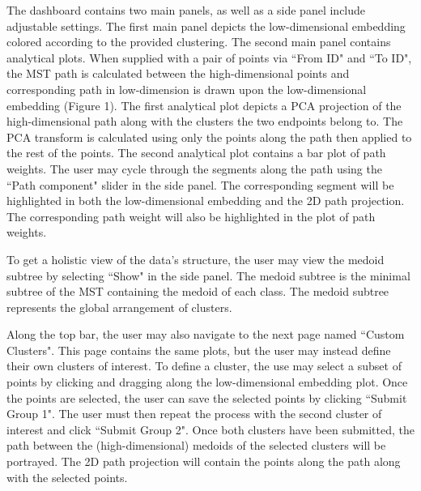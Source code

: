 \documentclass{article}
\begin{document}
The dashboard contains two main panels, as well as a side panel include adjustable settings. The first main panel depicts the low-dimensional embedding colored according to the provided clustering. The second main panel contains analytical plots. When supplied with a pair of points via ``From ID" and ``To ID", the MST path is calculated between the high-dimensional points and corresponding path in low-dimension is drawn upon the low-dimensional embedding (Figure 1). The first analytical plot depicts a PCA projection of the high-dimensional path along with the clusters the two endpoints belong to. The PCA transform is calculated using only the points along the path then applied to the rest of the points. The second analytical plot contains a bar plot of path weights. The user may cycle through the segments along the path using the ``Path component" slider in the side panel. The corresponding segment will be highlighted in both the low-dimensional embedding and the 2D path projection. The corresponding path weight will also be highlighted in the plot of path weights.

To get a holistic view of the data's structure, the user may view the medoid subtree by selecting ``Show" in the side panel. The medoid subtree is the minimal subtree of the MST containing the medoid of each class. The medoid subtree represents the global arrangement of clusters.

Along the top bar, the user may also navigate to the next page named ``Custom Clusters". This page contains the same plots, but the user may instead define their own clusters of interest. To define a cluster, the use may select a subset of points by clicking and dragging along the low-dimensional embedding plot. Once the points are selected, the user can save the selected points by clicking ``Submit Group 1". The user must then repeat the process with the second cluster of interest and click ``Submit Group 2". Once both clusters have been submitted, the path between the (high-dimensional) medoids of the selected clusters will be portrayed. The 2D path projection will contain the points along the path along with the selected points.

\newpage
\end{document}
